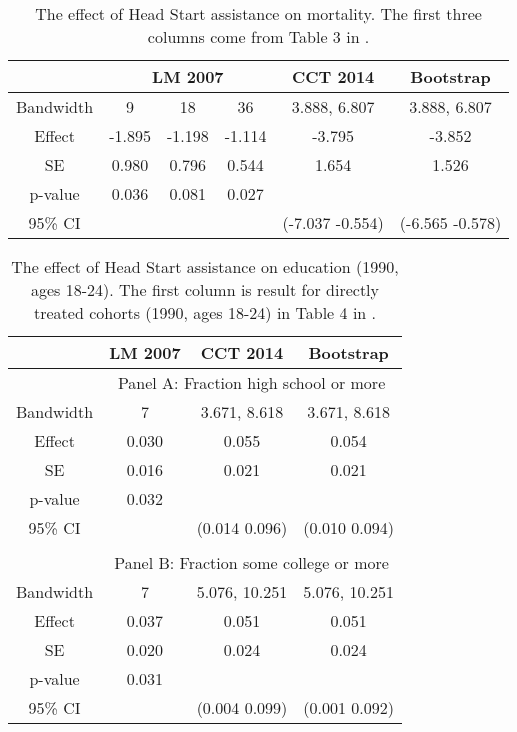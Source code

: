 \documentclass[12pt,fleqn]{article}
\begin{document}
\begin{table}[ht]
	\centering
	\begin{tabular}{cccccc}
		\toprule
		& \multicolumn{3}{c}{LM 2007} & CCT 2014 & Bootstrap \\
		\midrule
		Bandwidth & 9 & 18 & 36 & 3.888, 6.807 & 3.888, 6.807 \\
		Effect    & -1.895 & -1.198 & -1.114 & -3.795 & -3.852 \\
		SE        & 0.980 & 0.796  & 0.544 & 1.654 & 1.526 \\
		p-value   & 0.036   & 0.081   & 0.027  & & \\
		95\% CI   & & & & (-7.037 -0.554) & (-6.565 -0.578) \\
		\bottomrule
	\end{tabular}
	\caption{The effect of Head Start assistance on mortality. The first three columns come from Table 3 in \cite{ludwig2007}.}
	\label{tab: mortality}
\end{table}


\begin{table}[ht]
	\centering
	\begin{tabular}{cccc}
		\toprule
		& LM 2007 & CCT 2014 & Bootstrap \\
		\midrule
		& \multicolumn{3}{c}{Panel A: Fraction high school or more} \\
		Bandwidth & 7 & 3.671, 8.618 & 3.671, 8.618 \\
		Effect    & 0.030 & 0.055 & 0.054 \\
		SE        & 0.016 & 0.021 & 0.021 \\
		p-value   & 0.032 & & \\
		95\% CI        & & (0.014 0.096) & (0.010 0.094) \\

		&&& \\
		& \multicolumn{3}{c}{Panel B: Fraction some college or more} \\
		Bandwidth & 7 & 5.076, 10.251 & 5.076, 10.251 \\
		Effect    & 0.037 & 0.051 & 0.051 \\
		SE        & 0.020 & 0.024 & 0.024 \\
		p-value   & 0.031 & & \\
		95\% CI        & & (0.004 0.099) & (0.001 0.092) \\
		\bottomrule
	\end{tabular}
	\caption{The effect of Head Start assistance on education (1990, ages 18-24). The first column is result for directly treated cohorts (1990, ages 18-24) in Table 4 in \cite{ludwig2007}.}
	\label{tab: education 1990 ages 18-24}
\end{table}
\end{document}
